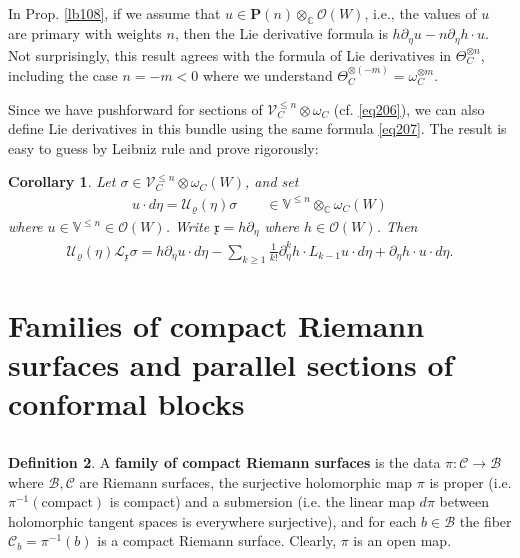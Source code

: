 \documentclass[11pt,b5paper,notitlepage]{article}
\theoremstyle{definition}
\newtheorem{df}{Definition}[section]
\theoremstyle{plain}
\newtheorem{co}[df]{Corollary}
\newcommand{\mc}{\mathcal}
\newcommand{\scr}{\mathscr}
\newcommand{\xk}{\mathfrak x}
\newcommand{\mbf}{\mathbf}
\newcommand{\Vbb}{\mathbb V}
\newcommand{\Cbb}{\mathbb C}
\numberwithin{equation}{section}
\begin{document}
\subsection{}


In Prop. \ref{lb108}, if we assume that  $u\in\mbf P(n)\otimes_\Cbb\scr O(W)$, i.e., the values of $u$ are primary with weights $n$, then the Lie derivative formula is $h\partial_\eta u-n\partial_\eta h\cdot u$. Not surprisingly, this result agrees with the formula of Lie derivatives in $\Theta_C^{\otimes n}$, including the case $n=-m<0$ where we understand $\Theta_C^{\otimes (-m)}=\omega_C^{\otimes m}$.  

Since we have pushforward for sections of $\scr V_C^{\leq n}\otimes\omega_C$ (cf. \eqref{eq206}), we can also define Lie derivatives in this bundle using the same formula \eqref{eq207}. The result is easy to guess by Leibniz rule and prove rigorously:

\begin{co}\label{lb130}
Let $\sigma\in\scr V^{\leq n}_C\otimes\omega_C(W)$, and set
\begin{align*}
u\cdot d\eta=\mc U_\varrho(\eta)\sigma\qquad\in\Vbb^{\leq n}\otimes_\Cbb\omega_C(W)
\end{align*}
where $u\in\Vbb^{\leq n}\in\scr O(W)$. Write $\xk=h\partial_\eta$ where $h\in\scr O(W)$. Then
\begin{align}
\mc U_\varrho(\eta)\mc L_\xk\sigma=h\partial_\eta u\cdot d\eta-\sum_{k\geq1} \frac 1{k!}\partial_\eta^k h\cdot L_{k-1}u\cdot d\eta+\partial_\eta h\cdot u\cdot d\eta.
\end{align}
\end{co}





\section{Families of compact Riemann surfaces and parallel sections of conformal blocks}


\subsection{}


\begin{df}
A \textbf{family of compact Riemann surfaces} is the data $\pi:\mc C\rightarrow\mc B$ where $\mc B,\mc C$ are Riemann surfaces,  the surjective holomorphic map $\pi$ is proper (i.e. $\pi^{-1}(\text{compact})$ is compact) and a submersion (i.e. the linear map $d\pi$ between holomorphic tangent spaces is everywhere surjective), and for each $b\in\mc B$ the fiber $\mc C_b=\pi^{-1}(b)$ \index{Cb@$\mc C_b=\pi^{-1}(b)$, the fiber of $\mc C$ at $b$} is a compact Riemann surface. Clearly, $\pi$ is an open map.
\end{df}
\end{document}
